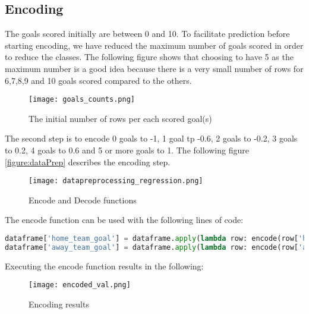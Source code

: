 \subsection {Encoding}

The goals scored initially are between 0 and 10.
To facilitate prediction before starting encoding, we have reduced the maximum number of goals scored in order to reduce the classes. The following figure shows that choosing to have 5 as the maximum number is a good idea because there is a very small number of rows for 6,7,8,9 and 10 goals scored compared to the others.

\begin{figure}[H]
\begin{center}
\texttt{[image: goals\_counts.png]}
\end{center}
\caption{The initial number of rows per each scored goal(s)}
\label{figure:goals_counts}
\end{figure}


The second step is to encode 0 goals to -1, 1 goal tp -0.6, 2 goals to -0.2, 3 goals to 0.2, 4 goals to 0.6 and 5 or more goals to 1.
The following figure \autoref{figure:dataPrep} describes the encoding step.\newline
\begin{figure}[H]
\begin{center}
\texttt{[image: datapreprocessing\_regression.png]}
\end{center}
\caption{Encode and Decode functions}
\label{figure:dataPrep}
\end{figure}



The encode function can be used with the following lines of code:

\begin{lstlisting}[language=Python, caption=Scored goals Python code for encoding classes]
dataframe['home_team_goal'] = dataframe.apply(lambda row: encode(row['home_team_goal']), axis=1)
dataframe['away_team_goal'] = dataframe.apply(lambda row: encode(row['away_team_goal']), axis=1)
\end{lstlisting}


Executing the encode function results in the following:

\begin{figure}[H]
\begin{center}
\texttt{[image: encoded\_val.png]}
\end{center}
\caption{Encoding results}
\label{figure:encoding}
\end{figure}


